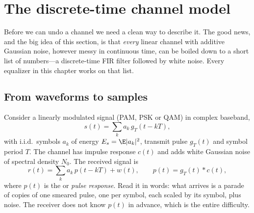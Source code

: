 \section{The discrete-time channel model}
\label{sec:ch12:model}

Before we can undo a channel we need a clean way to describe it. The good news, and the big idea
of this section, is that \emph{every} linear channel with additive Gaussian noise, however messy
in continuous time, can be boiled down to a short list of numbers---a discrete-time FIR filter
followed by white noise. Every equalizer in this chapter works on that list.


\subsection{From waveforms to samples}

Consider a linearly modulated signal (PAM, PSK or QAM) in complex baseband,
\begin{equation}
s(t)=\sum_k a_k\,g_T(t-kT),
\end{equation}
with i.i.d.\ symbols $a_k$ of energy $E_s=\E|a_k|^2$, transmit pulse $g_T(t)$ and symbol period
$T$. The channel has impulse response $c(t)$ and adds white Gaussian noise of spectral density
$N_0$. The received signal is
\begin{equation}
r(t)=\sum_k a_k\,p(t-kT)+w(t),\qquad p(t)=g_T(t)*c(t),
\label{eq:ch12:rx}
\end{equation}
where $p(t)$ is the  or \emph{pulse response}. Read it in words: what arrives
is a parade of copies of one smeared pulse, one per symbol, each scaled by its symbol, plus
noise. The receiver does not know $p(t)$ in advance, which is the entire difficulty.

